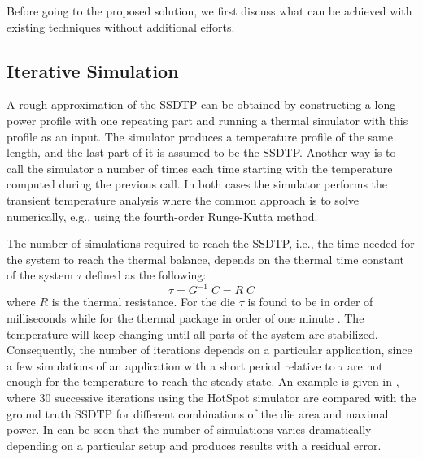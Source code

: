 Before going to the proposed solution, we first discuss what can be achieved with existing techniques without additional efforts.

\subsection{Iterative Simulation}
A rough approximation of the SSDTP can be obtained by constructing a long power profile with one repeating part and running a thermal simulator with this profile as an input. The simulator produces a temperature profile of the same length, and the last part of it is assumed to be the SSDTP. Another way is to call the simulator a number of times each time starting with the temperature computed during the previous call. In both cases the simulator performs the transient temperature analysis where the common approach is to solve  numerically, e.g., using the fourth-order Runge-Kutta method.

The number of simulations required to reach the SSDTP, i.e., the time needed for the system to reach the thermal balance, depends on the thermal time constant of the system $\tau$ defined as the following:
\[
  \tau = G^{-1} \; C = R \; C
\]
where $R$ is the thermal resistance. For the die $\tau$ is found to be in order of milliseconds while for the thermal package in order of one minute \cite{rao2007}. The temperature will keep changing until all parts of the system are stabilized. Consequently, the number of iterations depends on a particular application, since a few simulations of an application with a short period relative to $\tau$ are not enough for the temperature to reach the steady state. An example is given in , where 30 successive iterations using the HotSpot simulator \cite{huang2006} are compared with the ground truth SSDTP for different combinations of the die area and maximal power. In can be seen that the number of simulations varies dramatically depending on a particular setup and produces results with a residual error.

